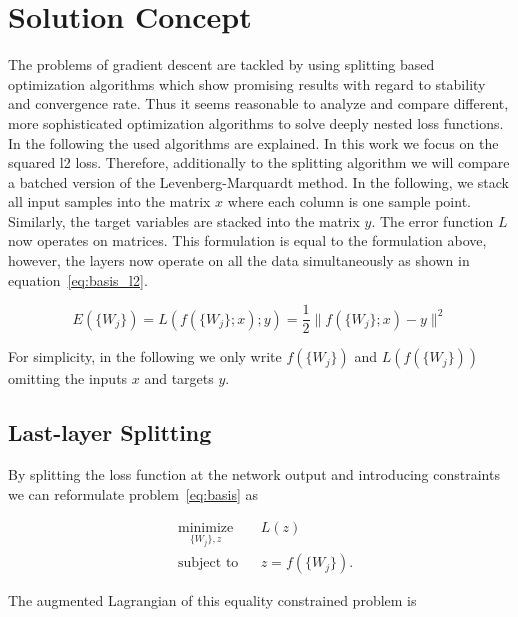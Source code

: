 \documentclass[english,11pt,a4paper]{article}
\begin{document}
\section{Solution Concept}

The problems of gradient descent are tackled by using splitting based optimization algorithms \cite{carreira2014distributed,taylor2016training} which show promising results with regard to stability and convergence rate. Thus it seems reasonable to analyze and compare different, more sophisticated optimization algorithms to solve deeply nested loss functions. In the following the used algorithms are explained. In this work we focus on the squared l2 loss. Therefore, additionally to the splitting algorithm we will compare a batched version of the Levenberg-Marquardt method. In the following, we stack all input samples into the matrix $x$ where each column is one sample point. Similarly, the target variables are stacked into the matrix $y$. The error function $L$ now operates on matrices. This formulation is equal to the formulation above, however, the layers now operate on all the data simultaneously as shown in equation~\ref{eq:basis_l2}.

\begin{equation}
	E(\{W_j\}) = L(f(\{W_j\};x);y) = \frac{1}{2} \| f(\{W_j\};x) - y \|^2
	\label{eq:basis_l2}
\end{equation}

For simplicity, in the following we only write $f(\{W_j\})$ and $L(f(\{W_j\}))$ omitting the inputs $x$ and targets $y$. 

\subsection{Last-layer Splitting}
\label{sec:last-layer_splitting}

By splitting the loss function at the network output and introducing constraints we can reformulate problem~\ref{eq:basis} as

\begin{equation}
	\begin{aligned}
		& \underset{\{W_j\},z}{\text{minimize}}
		&& L(z) \\
		& \text{subject to}
		&& z = f(\{W_j\}).
	\end{aligned}
	\label{eq:last-layer_splitting_problem}
\end{equation}

The augmented Lagrangian of this equality constrained problem is
\end{document}
